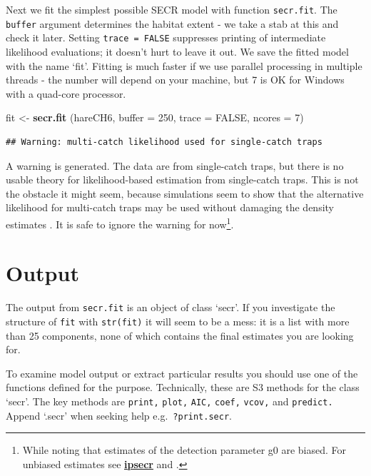 \documentclass[
]{book}
\newenvironment{Shaded}{\begin{snugshade}}{\end{snugshade}}
\newcommand{\AttributeTok}[1]{\textcolor[rgb]{0.13,0.29,0.53}{#1}}
\newcommand{\ConstantTok}[1]{\textcolor[rgb]{0.56,0.35,0.01}{#1}}
\newcommand{\DecValTok}[1]{\textcolor[rgb]{0.00,0.00,0.81}{#1}}
\newcommand{\FunctionTok}[1]{\textcolor[rgb]{0.13,0.29,0.53}{\textbf{#1}}}
\newcommand{\NormalTok}[1]{#1}
\newcommand{\OtherTok}[1]{\textcolor[rgb]{0.56,0.35,0.01}{#1}}
\begin{document}
Next we fit the simplest possible SECR model with function \texttt{secr.fit}. The \texttt{buffer} argument determines the habitat extent - we take a stab at this and check it later. Setting \texttt{trace\ =\ FALSE} suppresses printing of intermediate likelihood evaluations; it doesn't hurt to leave it out. We save the fitted model with the name `fit'. Fitting is much faster if we use parallel processing in multiple threads - the number will depend on your machine, but 7 is OK for Windows with a quad-core processor.

\begin{Shaded}
\begin{Highlighting}[]
\NormalTok{fit }\OtherTok{\textless{}{-}} \FunctionTok{secr.fit}\NormalTok{ (hareCH6, }\AttributeTok{buffer =} \DecValTok{250}\NormalTok{, }\AttributeTok{trace =} \ConstantTok{FALSE}\NormalTok{, }\AttributeTok{ncores =} \DecValTok{7}\NormalTok{)}
\end{Highlighting}
\end{Shaded}

\begin{verbatim}
## Warning: multi-catch likelihood used for single-catch traps
\end{verbatim}

A warning is generated. The data are from single-catch traps, but there is no usable theory for likelihood-based estimation from single-catch traps. This is not the obstacle it might seem, because simulations seem to show that the alternative likelihood for multi-catch traps may be used without damaging the density estimates \citep{ebb09}. It is safe to ignore the warning for now\footnote{While noting that estimates of the detection parameter g0 are biased. For unbiased estimates see \textbf{\href{https://CRAN.R-project.org/package=ipsecr}{ipsecr}} and \citet{Efford2023}.}.

\section{Output}\label{output}

The output from \texttt{secr.fit} is an object of class `secr'. If you investigate the structure of \texttt{fit} with \texttt{str(fit)} it will seem to be a mess: it is a list with more than 25 components, none of which contains the final estimates you are looking for.

To examine model output or extract particular results you should use one of the functions defined for the purpose. Technically, these are S3 methods for the class `secr'. The key methods are \texttt{print,} \texttt{plot,} \texttt{AIC,} \texttt{coef,} \texttt{vcov,} and \texttt{predict.} Append `.secr' when seeking help e.g.~\texttt{?print.secr}.
\end{document}
